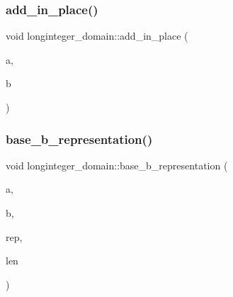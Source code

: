 \subsubsection{\texorpdfstring{add\+\_\+in\+\_\+place()}{add\_in\_place()}}
{\footnotesize\ttfamily void longinteger\+\_\+domain\+::add\+\_\+in\+\_\+place (\begin{DoxyParamCaption}\item[{\mbox{\hyperlink{classlonginteger__object}{longinteger\+\_\+object}} \&}]{a,  }\item[{\mbox{\hyperlink{classlonginteger__object}{longinteger\+\_\+object}} \&}]{b }\end{DoxyParamCaption})}

\mbox{\label{classlonginteger__domain_abe671698af1fc0150d7adb18975788fc}} 
\subsubsection{\texorpdfstring{base\+\_\+b\+\_\+representation()}{base\_b\_representation()}}
{\footnotesize\ttfamily void longinteger\+\_\+domain\+::base\+\_\+b\+\_\+representation (\begin{DoxyParamCaption}\item[{\mbox{\hyperlink{classlonginteger__object}{longinteger\+\_\+object}} \&}]{a,  }\item[{\mbox{\hyperlink{galois_8h_a09fddde158a3a20bd2dcadb609de11dc}{I\+NT}}}]{b,  }\item[{\mbox{\hyperlink{galois_8h_a09fddde158a3a20bd2dcadb609de11dc}{I\+NT}} $\ast$\&}]{rep,  }\item[{\mbox{\hyperlink{galois_8h_a09fddde158a3a20bd2dcadb609de11dc}{I\+NT}} \&}]{len }\end{DoxyParamCaption})}

\mbox{\label{classlonginteger__domain_a7033ded284ed653b596f84028ffeda83}} 
